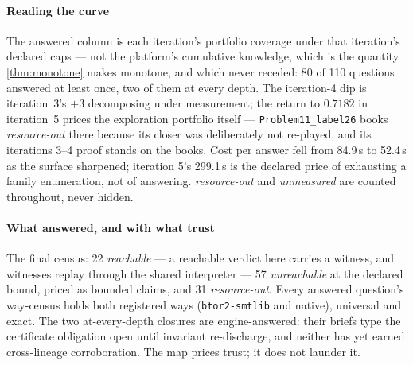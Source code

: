 \paragraph{Reading the curve}
The answered column is each iteration's portfolio coverage under
that iteration's declared caps --- not the platform's cumulative
knowledge, which is the quantity \cref{thm:monotone} makes monotone,
and which never receded: 80 of 110 questions answered at least once,
two of them at every depth. The iteration-4 dip is iteration~3's
$+3$ decomposing under measurement; the return to $0.7182$ in
iteration~5 prices the exploration portfolio itself ---
\texttt{Problem11\_label26} books \textit{resource-out} there
because its closer was deliberately not re-played, and its
iterations 3--4 proof stands on the books. Cost per answer fell from
84.9\,s to 52.4\,s as the surface sharpened; iteration 5's 299.1\,s
is the declared price of exhausting a family enumeration, not of
answering. \textit{resource-out} and \textit{unmeasured} are counted
throughout, never hidden.

\paragraph{What answered, and with what trust}
The final census: 22 \textit{reachable} --- a reachable verdict here
carries a witness, and witnesses replay through the shared
interpreter --- 57 \textit{unreachable} at the declared bound,
priced as bounded claims, and 31 \textit{resource-out}. Every
answered question's way-census holds both registered ways
(\texttt{btor2-smtlib} and native), universal and exact. The two
at-every-depth closures are engine-answered: their briefs type the
certificate obligation open until invariant re-discharge, and
neither has yet earned cross-lineage corroboration. The map prices
trust; it does not launder it.

